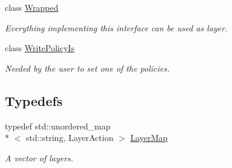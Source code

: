 \begin{DoxyCompactItemize}
class \hyperlink{classkdb_1_1Wrapped}{Wrapped}
\begin{DoxyCompactList}\small\item\em Everything implementing this interface can be used as layer. \end{DoxyCompactList}\item 
class \hyperlink{classkdb_1_1WritePolicyIs}{Write\+Policy\+Is}
\begin{DoxyCompactList}\small\item\em Needed by the user to set one of the policies. \end{DoxyCompactList}\end{DoxyCompactItemize}
\subsection*{Typedefs}
\begin{DoxyCompactItemize}
\item 
\hypertarget{namespacekdb_ac389d72a0c7be0c026628870f81148fe}{typedef std\+::unordered\+\_\+map\\*
$<$ std\+::string, Layer\+Action $>$ \hyperlink{namespacekdb_ac389d72a0c7be0c026628870f81148fe}{Layer\+Map}}\label{namespacekdb_ac389d72a0c7be0c026628870f81148fe}

\begin{DoxyCompactList}\small\item\em A vector of layers. \end{DoxyCompactList}\end{DoxyCompactItemize}
